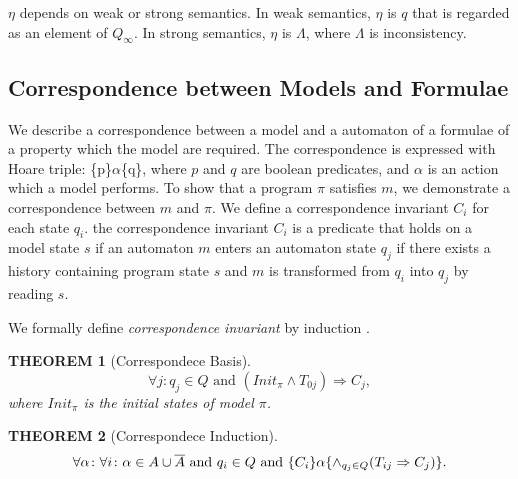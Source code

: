 \documentclass[12pt,a4paper,titlepage]{article}
\theoremstyle{break}
\newtheorem{theorem}{THEOREM}[section]
\begin{document}
\(\eta\) depends on weak or strong semantics.
In weak semantics, \(\eta\) is \(q\) that is regarded as an element of \(Q_{\infty}\).
In strong semantics, \(\eta\) is \(\Lambda\), where \(\Lambda\) is inconsistency.
%
%
\subsection{Correspondence between Models and Formulae}\label{sec:CorrespondenceBtweenModelsAndFormulae}
We describe a correspondence between a model and a \buchi automaton of a formulae of a property which the model are required.
The correspondence is expressed with Hoare triple: \{p\}$\alpha$\{q\},
where $p$ and $q$ are boolean predicates, and $\alpha$ is an action which a model performs.
To show that a program \(\pi\) satisfies $m$, we demonstrate a correspondence between $m$ and \(\pi\).
We define a correspondence invariant \(C_i\) for each state \(q_i\).
the correspondence invariant \(C_i\) is a predicate that holds on a model state $s$ if an automaton $m$ enters an automaton state \(q_j\) if there exists a history containing program state $s$ and $m$ is transformed from \(q_i\) into \(q_j\) by reading $s$.

We formally define \emph{correspondence invariant} by induction \cite{Alpern:1989}.
\begin{theorem}[Correspondece Basis]\label{th:CorrBasis}
  \begin{displaymath}
\forall j\colon q_j\in Q\mbox{ and }(Init_{\pi}\wedge T_{0j})\Rightarrow C_j,
  \end{displaymath}
where \(Init_{\pi}\) is the initial states of model \(\pi\).
\end{theorem}
\begin{theorem}[Correspondece Induction]\label{th:CorrInd}
  \begin{displaymath}
\forall \alpha\colon\forall i\colon\alpha\in A\cup\mbox{$\overline{A}$}\mbox{ and }q_i\in Q\mbox{ and }
\{C_i\}\alpha\{\wedge_{q_j\in Q}(T_{ij}\Rightarrow C_j)\}.
  \end{displaymath}
\end{theorem}
\end{document}
